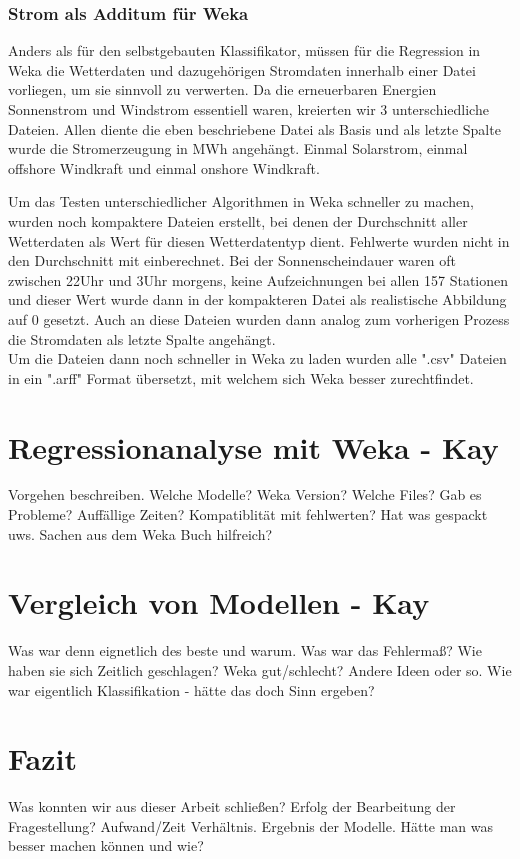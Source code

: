 \documentclass[letterpaper]{article} %
\begin{document}
        \subsubsection*{Strom als Additum für Weka}
            Anders als für den selbstgebauten Klassifikator, müssen für die Regression in Weka die Wetterdaten und dazugehörigen Stromdaten innerhalb einer Datei vorliegen, um sie sinnvoll zu verwerten. Da die erneuerbaren Energien Sonnenstrom und Windstrom essentiell waren, kreierten wir 3 unterschiedliche Dateien. Allen diente die eben beschriebene Datei als Basis und als letzte Spalte wurde die Stromerzeugung in MWh angehängt. Einmal Solarstrom, einmal offshore Windkraft und einmal onshore Windkraft.

            Um das Testen unterschiedlicher Algorithmen in Weka schneller zu machen, wurden noch kompaktere Dateien erstellt, bei denen der Durchschnitt aller Wetterdaten als Wert für diesen Wetterdatentyp dient. Fehlwerte wurden nicht in den Durchschnitt mit einberechnet. Bei der Sonnenscheindauer waren oft zwischen 22Uhr und 3Uhr morgens, keine Aufzeichnungen bei allen 157 Stationen und dieser Wert wurde dann in der kompakteren Datei als realistische Abbildung auf 0 gesetzt.
            Auch an diese Dateien wurden dann analog zum vorherigen Prozess die Stromdaten als letzte Spalte angehängt.
        \\

        Um die Dateien dann noch schneller in Weka zu laden wurden alle ".csv" Dateien in ein ".arff" Format übersetzt, mit welchem sich Weka besser zurechtfindet.



\section*{Regressionanalyse mit Weka - Kay}
    Vorgehen beschreiben. Welche Modelle? Weka Version? Welche Files? Gab es Probleme? Auffällige Zeiten? Kompatiblität mit fehlwerten? Hat was gespackt uws. Sachen aus dem Weka Buch hilfreich?
\section*{Vergleich von Modellen - Kay}
    Was war denn eignetlich des beste und warum. Was war das Fehlermaß? Wie haben sie sich Zeitlich geschlagen? Weka gut/schlecht? Andere Ideen oder so. Wie war eigentlich Klassifikation - hätte das doch Sinn ergeben?
\section*{Fazit}
    Was konnten wir aus dieser Arbeit schließen? Erfolg der Bearbeitung der Fragestellung? Aufwand/Zeit Verhältnis. Ergebnis der Modelle. Hätte man was besser machen können und wie?
    

\end{document}
